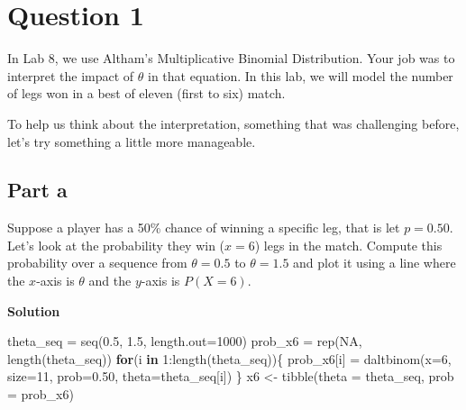 \documentclass[
]{article}
\newenvironment{Shaded}{\begin{snugshade}}{\end{snugshade}}
\newcommand{\AttributeTok}[1]{\textcolor[rgb]{0.40,0.45,0.13}{#1}}
\newcommand{\ConstantTok}[1]{\textcolor[rgb]{0.56,0.35,0.01}{#1}}
\newcommand{\ControlFlowTok}[1]{\textcolor[rgb]{0.00,0.23,0.31}{\textbf{#1}}}
\newcommand{\DecValTok}[1]{\textcolor[rgb]{0.68,0.00,0.00}{#1}}
\newcommand{\FloatTok}[1]{\textcolor[rgb]{0.68,0.00,0.00}{#1}}
\newcommand{\FunctionTok}[1]{\textcolor[rgb]{0.28,0.35,0.67}{#1}}
\newcommand{\NormalTok}[1]{\textcolor[rgb]{0.00,0.23,0.31}{#1}}
\newcommand{\OtherTok}[1]{\textcolor[rgb]{0.00,0.23,0.31}{#1}}
\newcommand{\SpecialCharTok}[1]{\textcolor[rgb]{0.37,0.37,0.37}{#1}}
\begin{document}
\normalsize

\section{Question 1}\label{question-1}

In Lab 8, we use Altham's Multiplicative Binomial Distribution. Your job
was to interpret the impact of \(\theta\) in that equation. In this lab,
we will model the number of legs won in a best of eleven (first to six)
match.

To help us think about the interpretation, something that was
challenging before, let's try something a little more manageable.

\subsection{Part a}\label{part-a}

Suppose a player has a 50\% chance of winning a specific leg, that is
let \(p=0.50\). Let's look at the probability they win (\(x=6\)) legs in
the match. Compute this probability over a sequence from \(\theta=0.5\)
to \(\theta=1.5\) and plot it using a line where the \(x\)-axis is
\(\theta\) and the \(y\)-axis is \(P(X=6)\).

\textbf{Solution}

\normalsize

\begin{Shaded}
\begin{Highlighting}[numbers=left,,]
\NormalTok{theta\_seq }\OtherTok{=} \FunctionTok{seq}\NormalTok{(}\FloatTok{0.5}\NormalTok{, }\FloatTok{1.5}\NormalTok{, }\AttributeTok{length.out=}\DecValTok{1000}\NormalTok{)}
\NormalTok{prob\_x6 }\OtherTok{=} \FunctionTok{rep}\NormalTok{(}\ConstantTok{NA}\NormalTok{, }\FunctionTok{length}\NormalTok{(theta\_seq))}
\ControlFlowTok{for}\NormalTok{(i }\ControlFlowTok{in} \DecValTok{1}\SpecialCharTok{:}\FunctionTok{length}\NormalTok{(theta\_seq))\{}
\NormalTok{  prob\_x6[i] }\OtherTok{=} \FunctionTok{daltbinom}\NormalTok{(}\AttributeTok{x=}\DecValTok{6}\NormalTok{, }\AttributeTok{size=}\DecValTok{11}\NormalTok{, }\AttributeTok{prob=}\FloatTok{0.50}\NormalTok{, }\AttributeTok{theta=}\NormalTok{theta\_seq[i])}
\NormalTok{\}}
\NormalTok{x6 }\OtherTok{\textless{}{-}} \FunctionTok{tibble}\NormalTok{(}\AttributeTok{theta =}\NormalTok{ theta\_seq,}
            \AttributeTok{prob  =}\NormalTok{ prob\_x6)}
\end{Highlighting}
\end{Shaded}
\end{document}
